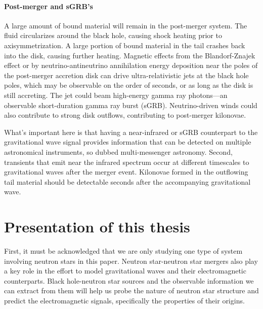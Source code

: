 \paragraph{Post-merger and sGRB's}
A large amount of bound material will remain in the post-merger system.  
The fluid circularizes around the black hole, causing shock heating prior to axisymmetrization. 
A large portion of bound material in the tail crashes back into the disk, causing further heating.
Magnetic effects from the Blandorf-Znajek effect or by neutrino-antineutrino annihilation energy deposition near the poles of the post-merger accretion disk can drive ultra-relativistic jets at the black hole poles, which may be observable on the order of seconds, or as long as the disk is still accreting.
The jet could beam high-energy gamma ray photons---an observable short-duration gamma ray burst (sGRB).
Neutrino-driven winds could also contribute to strong disk outflows, contributing to post-merger kilonovae.

What's important here is that having a near-infrared or sGRB counterpart to the gravitational wave signal provides information that can be detected on multiple astronomical instruments, so dubbed multi-messenger astronomy.
Second, transients that emit near the infrared spectrum occur at different timescales to gravitational waves after the merger event.
Kilonovae formed in the outflowing tail material should be detectable seconds after the accompanying gravitational wave.  


\section{Presentation of this thesis}

First, it must be acknowledged that we are only studying one type of system involving neutron stars in this paper.  Neutron star-neutron star mergers also play a key role in the effort to model gravitational waves and their electromagnetic counterparts. 
Black hole-neutron star sources and the observable information we can extract from them will help us probe the nature of neutron star structure and predict the electromagnetic signals, specifically the properties of  their origins.

